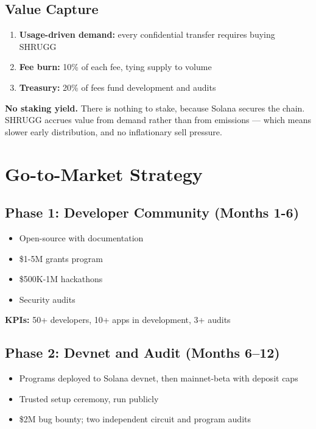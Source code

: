 \documentclass[11pt,a4paper]{article}
\begin{document}
\subsection{Value Capture}

\begin{enumerate}[leftmargin=*]
    \item \textbf{Usage-driven demand:} every confidential transfer requires buying SHRUGG
    \item \textbf{Fee burn:} 10\% of each fee, tying supply to volume
    \item \textbf{Treasury:} 20\% of fees fund development and audits
\end{enumerate}

\textbf{No staking yield.} There is nothing to stake, because Solana secures the chain. SHRUGG accrues value from demand rather than from emissions --- which means slower early distribution, and no inflationary sell pressure.

\section{Go-to-Market Strategy}

\subsection{Phase 1: Developer Community (Months 1-6)}

\begin{itemize}[leftmargin=*]
    \item Open-source with documentation
    \item \$1-5M grants program
    \item \$500K-1M hackathons
    \item Security audits
\end{itemize}

\textbf{KPIs:} 50+ developers, 10+ apps in development, 3+ audits

\subsection{Phase 2: Devnet and Audit (Months 6--12)}

\begin{itemize}[leftmargin=*]
    \item Programs deployed to Solana devnet, then mainnet-beta with deposit caps
    \item Trusted setup ceremony, run publicly
    \item \$2M bug bounty; two independent circuit and program audits
\end{itemize}
\end{document}
